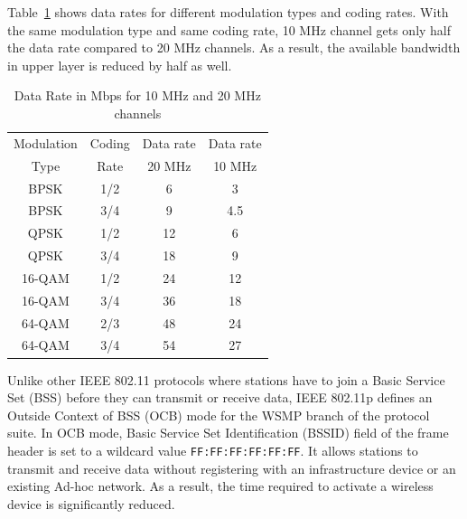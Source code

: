 \documentclass[12pt]{report}
\begin{document}
Table~\ref{tab:data_rate} shows data rates \cite{kenney2011} for different modulation types and coding rates. With the same modulation type and same coding rate, 10 MHz channel gets only half the data rate compared to 20 MHz channels. As a result, the available bandwidth in upper layer is reduced by half as well.

\begin{table}[htb]
  \begin{center}
    \begin{tabular}{|c|c|c|c|}
      \hline
      Modulation & Coding & Data rate & Data rate     \\
      Type       & Rate   & 20 MHz    & 10 MHz        \\\hline
      BPSK       & 1/2    & 6         & 3             \\\hline
      BPSK       & 3/4    & 9         & 4.5           \\\hline
      QPSK       & 1/2    & 12        & 6             \\\hline
      QPSK       & 3/4    & 18        & 9             \\\hline
      16-QAM     & 1/2    & 24        & 12            \\\hline
      16-QAM     & 3/4    & 36        & 18            \\\hline
      64-QAM     & 2/3    & 48        & 24            \\\hline
      64-QAM     & 3/4    & 54        & 27            \\\hline
    \end{tabular}
    \caption{\label{tab:data_rate}Data Rate in Mbps for 10 MHz and 20 MHz channels}
  \end{center}
\end{table}

Unlike other IEEE 802.11 protocols where stations have to join a Basic Service Set (BSS) before they can transmit or receive data, IEEE 802.11p defines an Outside Context of BSS (OCB) mode for the WSMP branch of the protocol suite. In OCB mode, Basic Service Set Identification (BSSID) field of the frame header is set to a wildcard value \texttt{FF:FF:FF:FF:FF:FF}. It allows stations to transmit and receive data without registering with an infrastructure device or an existing Ad-hoc network. As a result, the time required to activate a wireless device is significantly reduced.
\end{document}
